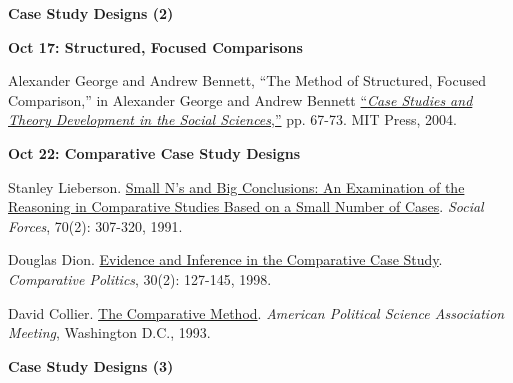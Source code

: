 \documentclass[letterpaper]{article}
\renewenvironment{itemize}{
  \begin{list}{}{
    \setlength{\leftmargin}{1.5em}
  }
}{
  \end{list}
}
\begin{document}
\begin{enumerate}
\item {\bf Case Study Designs (2)}
		
		\begin{itemize}
		\item {\bf Oct 17: Structured, Focused Comparisons}
			\begin{itemize}
				\item[$\bullet$] Alexander George and Andrew Bennett, ``The Method of Structured, Focused Comparison,'' in Alexander George and Andrew Bennett \href{https://www.alnap.org/system/files/content/resource/files/main/george-and-bennett-how-to-do-case-studies.pdf}{``\emph{Case Studies and Theory Development in the Social Sciences},''} pp. 67-73. MIT Press, 2004. 
			\end{itemize}
		\end{itemize}


		\begin{itemize}
		\item {\bf Oct 22: Comparative Case Study Designs}
			\begin{itemize}
				\item[$\bullet$] Stanley Lieberson. \href{http://www.jstor.org/stable/2580241}{Small N's and Big Conclusions: An Examination of the Reasoning in Comparative Studies Based on a Small Number of Cases}. \emph{Social Forces}, 70(2): 307-320, 1991. 
				\item[$\bullet$] Douglas Dion. \href{http://www.jstor.org/stable/422284}{Evidence and Inference in the Comparative Case Study}. \emph{Comparative Politics}, 30(2): 127-145, 1998.  %
				\item[$\bullet$] David Collier. \href{http://polisci.berkeley.edu/sites/default/files/people/u3827/APSA-TheComparativeMethod.pdf}{The Comparative Method}. \emph{American Political Science Association Meeting}, Washington D.C., 1993.
			\end{itemize}
		\end{itemize}


\item {\bf Case Study Designs (3)}


\end{enumerate}
\end{document}
